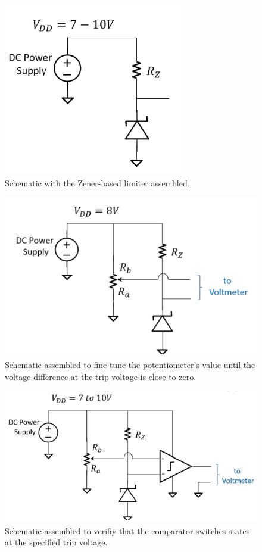 \documentclass[conference]{IEEEtran}
\begin{document}
\begin{figure}[htbp]
\centerline{\includegraphics{./images/circuit1.png}}
\caption{Schematic with the Zener-based limiter assembled. \cite{week7}}
\label{circuit1}
\end{figure}

\begin{figure}[htbp]
\centerline{\includegraphics{./images/circuit2.png}}
\caption{Schematic assembled to fine-tune the potentiometer's value until the voltage difference at the trip voltage is close to zero. \cite{week7}}
\label{circuit2}
\end{figure}

\begin{figure}[htbp]
\centerline{\includegraphics{./images/circuit3.png}}
\caption{Schematic assembled to verifiy that the comparator switches states at the specified trip voltage. \cite{b2}}
\label{circuit3}
\end{figure}
\end{document}
